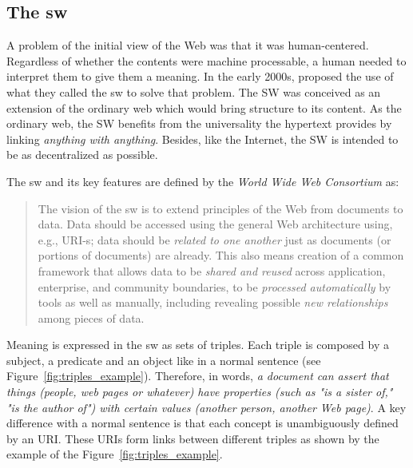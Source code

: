 \subsection{The \acl{sw}}
\label{sec:semantic_web}

A problem of the initial view of the Web was that it was human-centered.
Regardless of whether the contents were machine processable, a human needed to interpret them to give them a meaning.
In the early 2000s, \citet{berners-lee_semantic_2001} proposed the use of what they called the \acf{sw} to solve that problem.
The SW was conceived as an extension of the ordinary web which would bring structure to its content.
As the ordinary web, the SW benefits from the universality the hypertext provides by linking \emph{anything with anything}.
Besides, like the Internet, the SW is intended to be as decentralized as possible.

The \acl{sw} and its key features are defined by the \emph{World Wide Web Consortium} \citep{semanticWeb-FAQ} as:
\begin{quote}
The vision of the \acl{sw} is to extend principles of the Web from documents to data.
Data should be accessed using the general Web architecture using, e.g., URI-s;
data should be \emph{related to one another} just as documents (or portions of documents) are already.
This also means creation of a common framework that allows data to be \emph{shared and reused} across application, enterprise, and community boundaries,
to be \emph{processed automatically} by tools as well as manually, including revealing possible \emph{new relationships} among pieces of data.
\end{quote}

Meaning is expressed in the \acl{sw} as sets of triples.
Each triple is composed by a subject, a predicate and an object like in a normal sentence (see Figure~\ref{fig:triples_example}).
Therefore, in  \citeauthor{berners-lee_semantic_2001} words, \emph{a document can assert that things (people, web pages or whatever) have properties (such as "is a sister of," "is the author of") with certain values (another person, another Web page)}.
A key difference with a normal sentence is that each concept is unambiguously defined by an URI.
These URIs form links between different triples as shown by the example of the Figure~\ref{fig:triples_example}.



